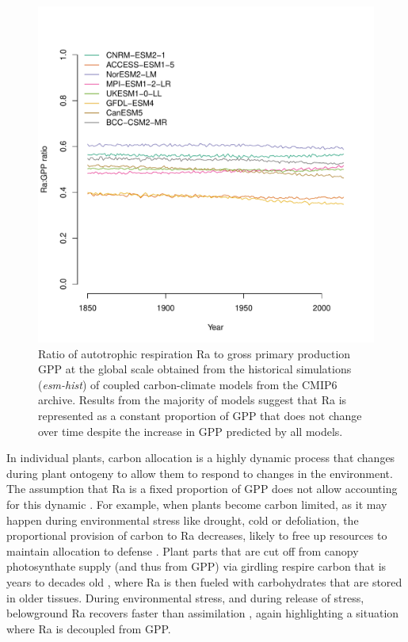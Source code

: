\documentclass[12pt, a4paper]{article}
\begin{document}
\begin{figure}[htbp]
   \centering
   \includegraphics[scale=0.8]{annualRaGPP.pdf} %
   \caption{Ratio of autotrophic respiration Ra to gross primary production GPP at the global scale obtained from the historical simulations (\emph{esm-hist}) of coupled carbon-climate models from the CMIP6 archive. Results from the majority of models suggest that Ra is represented as a constant proportion of GPP that does not change over time despite the increase in GPP predicted by all models.}
   \label{fig:annualRaGPP}
\end{figure}

In individual plants, carbon allocation is a highly dynamic process that changes during plant ontogeny to allow them to respond to changes in the environment. The assumption that Ra is a fixed proportion of GPP does not allow accounting for this dynamic \citep{Collalti2019}. For example, when plants become carbon limited, as it may happen during environmental stress like drought, cold or defoliation, the proportional provision of carbon to Ra decreases, likely to free up resources to maintain allocation to defense \citep{Huang2019EEB,Huang2019NP}. Plant parts that are cut off from canopy photosynthate supply (and thus from GPP) via girdling respire carbon that is years to decades old \citep{muhr:2013}, where Ra is then fueled with carbohydrates that are stored in older tissues. During environmental stress, and during release of stress, belowground Ra recovers faster than assimilation \citep{Hagedorn2016}, again highlighting a situation where Ra is decoupled from GPP.
\end{document}
